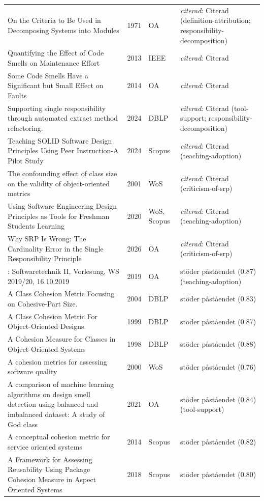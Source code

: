 \begin{longtable}{@{}%
  >{\raggedright\arraybackslash}p{}c%
  >{\raggedright\arraybackslash}p{}%
  >{\raggedright\arraybackslash}p{}@{}}
On the Criteria to Be Used in Decomposing Systems into Modules & 1971 & OA & \emph{citerad}: Citerad (definition-attribution; responsibility-decomposition) \\
Quantifying the Effect of Code Smells on Maintenance Effort & 2013 & IEEE & \emph{citerad}: Citerad \\
Some Code Smells Have a Significant but Small Effect on Faults & 2014 & OA & \emph{citerad}: Citerad \\
Supporting single responsibility through automated extract method refactoring. & 2024 & DBLP & \emph{citerad}: Citerad (tool-support; responsibility-decomposition) \\
Teaching SOLID Software Design Principles Using Peer Instruction-A Pilot Study & 2024 & Scopus & \emph{citerad}: Citerad (teaching-adoption) \\
The confounding effect of class size on the validity of object-oriented metrics & 2001 & WoS & \emph{citerad}: Citerad (criticism-of-srp) \\
Using Software Engineering Design Principles as Tools for Freshman Students Learning & 2020 & WoS, Scopus & \emph{citerad}: Citerad (teaching-adoption) \\
Why SRP Is Wrong: The Cardinality Error in the Single Responsibility Principle & 2026 & OA & \emph{citerad}: Citerad (criticism-of-srp) \\
01: Softwaretechnik II, Vorlesung, WS 2019/20, 16.10.2019 & 2019 & OA & stöder påståendet (0.87) (teaching-adoption) \\
A Class Cohesion Metric Focusing on Cohesive-Part Size. & 2004 & DBLP & stöder påståendet (0.83) \\
A Class Cohesion Metric For Object-Oriented Designs. & 1999 & DBLP & stöder påståendet (0.87) \\
A Cohesion Measure for Classes in Object-Oriented Systems & 1998 & DBLP & stöder påståendet (0.88) \\
A cohesion metrics for assessing software quality & 2000 & WoS & stöder påståendet (0.76) \\
A comparison of machine learning algorithms on design smell detection using balanced and imbalanced dataset: A study of God class & 2021 & OA & stöder påståendet (0.84) (tool-support) \\
A conceptual cohesion metric for service oriented systems & 2014 & Scopus & stöder påståendet (0.82) \\
A Framework for Assessing Reusability Using Package Cohesion Measure in Aspect Oriented Systems & 2018 & Scopus & stöder påståendet (0.80) \\

\end{longtable}
